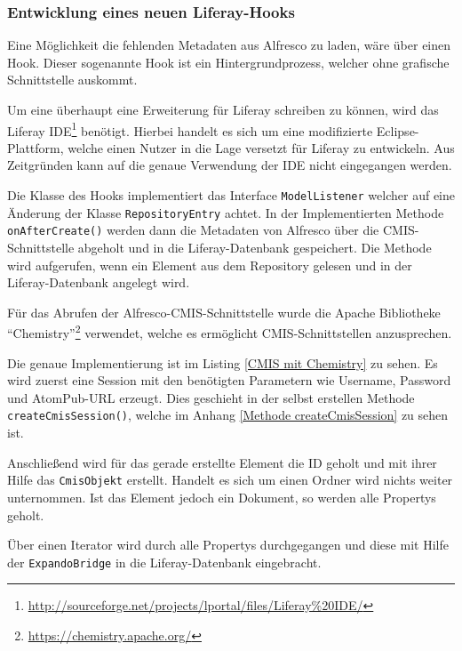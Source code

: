 \subsubsection{Entwicklung eines neuen Liferay-Hooks}\label{Liferay Hook}
Eine M\"oglichkeit die fehlenden Metadaten aus Alfresco zu laden, w\"are \"uber einen Hook. Dieser sogenannte Hook ist ein Hintergrundprozess, welcher ohne grafische Schnittstelle auskommt. \cite{Liferay_in_Action}

Um eine \"uberhaupt eine Erweiterung f\"ur Liferay schreiben zu k\"onnen, wird das Liferay IDE\footnote{\url{http://sourceforge.net/projects/lportal/files/Liferay\%20IDE/}} ben\"otigt. Hierbei handelt es sich um eine modifizierte Eclipse-Plattform, welche einen Nutzer in die Lage versetzt f\"ur Liferay zu entwickeln.
Aus Zeitgr\"unden kann auf die genaue Verwendung der IDE nicht eingegangen werden. 

Die Klasse des Hooks implementiert das Interface \texttt{ModelListener} welcher auf eine \"Anderung der Klasse \texttt{RepositoryEntry} achtet.
In der Implementierten Methode \texttt{onAfterCreate()} werden dann die Metadaten von Alfresco \"uber die \ac{CMIS}-Schnittstelle abgeholt und in die Liferay-Datenbank gespeichert. Die Methode wird aufgerufen, wenn ein Element aus dem Repository gelesen und in der Liferay-Datenbank angelegt wird.

F\"ur das Abrufen der Alfresco-\ac{CMIS}-Schnittstelle wurde die Apache Bibliotheke "`Chemistry"'\footnote{\url{https://chemistry.apache.org/}} verwendet, welche es erm\"oglicht \ac{CMIS}-Schnittstellen anzusprechen.

Die genaue Implementierung ist im Listing \ref{CMIS mit Chemistry} zu sehen. Es wird zuerst eine Session mit den ben\"otigten Parametern wie Username, Password und AtomPub-URL erzeugt. Dies geschieht in der selbst erstellen Methode \texttt{createCmisSession()}, welche im Anhang \ref{Methode createCmisSession} zu sehen ist.

Anschlie\ss{}end wird f\"ur das gerade erstellte Element die ID geholt und mit ihrer Hilfe das \texttt{CmisObjekt} erstellt.
Handelt es sich um einen Ordner wird nichts weiter unternommen. Ist das Element jedoch ein Dokument, so werden alle Propertys geholt.

\"Uber einen Iterator wird durch alle Propertys durchgegangen und diese mit Hilfe der \texttt{ExpandoBridge} in die Liferay-Datenbank eingebracht.



